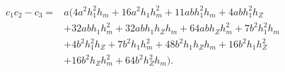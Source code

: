 \begin{align*}
c_1c_2-c_3={}&a\bigl(4 a^{2} h_{1}^{2} h_{m}+16 a^{2} h_{1} h_{m}^{2}+11 a b h_{1}^{2} h_{m}+4 a b h_{1}^{2} h_{Z}\\
&+32 a b h_{1} h_{m}^{2}+32 a b h_{1} h_{Z} h_{m}+64 a b h_{Z} h_{m}^{2}+7 b^{2} h_{1}^{2} h_{m}\\
&+4 b^{2} h_{1}^{2} h_{Z}+7 b^{2} h_{1} h_{m}^{2}+48 b^{2} h_{1} h_{Z} h_{m}+16 b^{2} h_{1} h_{Z}^{2}\\
&+16 b^{2} h_{Z} h_{m}^{2}+64 b^{2} h_{Z}^{2} h_{m}\bigr).
\end{align*}
